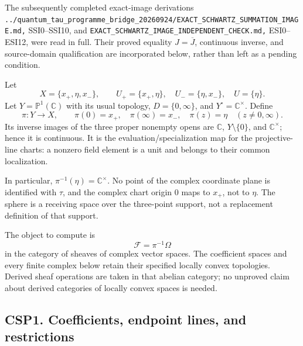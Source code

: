 The subsequently completed exact-image derivations
\nolinkurl{../quantum_tau_programme_bridge_20260924/EXACT_SCHWARTZ_SUMMATION_IMAGE.md,}
SSI0--SSI10, and \nolinkurl{EXACT_SCHWARTZ_IMAGE_INDEPENDENT_CHECK.md,}
ESI0--ESI12, were read in full. Their proved equality \(J=\overline J\),
continuous inverse, and source-domain qualification are incorporated
below, rather than left as a pending condition.

Let \[
X=\{x_+,\eta,x_-\},\qquad
U_+=\{x_+,\eta\},\quad U_-=\{\eta,x_-\},\quad U=\{\eta\}.
\tag{CSP0.1}
\] Let \(Y=\mathbb P^1(\mathbb C)\) with its usual topology,
\(D=\{0,\infty\}\), and \(Y^\circ=\mathbb C^\times\). Define \[
\pi:Y\longrightarrow X,\qquad
\pi(0)=x_+,\quad\pi(\infty)=x_-,\quad
\pi(z)=\eta\quad(z\ne0,\infty).
\tag{CSP0.2}
\] Its inverse images of the three proper nonempty opens are
\(\mathbb C\), \(Y\setminus\{0\}\), and \(\mathbb C^\times\); hence it
is continuous. It is the evaluation/specialization map for the
projective-line charts: a nonzero field element is a unit and belongs to
their common localization.

In particular, \(\pi^{-1}(\eta)=\mathbb C^\times\). No point of the
complex coordinate plane is identified with \(\tau\), and the complex
chart origin \(0\) maps to \(x_+\), not to \(\eta\). The sphere is a
receiving space over the three-point support, not a replacement
definition of that support.

The object to compute is \[
\mathscr F=\pi^{-1}\Omega
\tag{CSP0.3}
\] in the category of sheaves of complex vector spaces. The coefficient
spaces and every finite complex below retain their specified locally
convex topologies. Derived sheaf operations are taken in that abelian
category; no unproved claim about derived categories of locally convex
spaces is needed.

\subsection{CSP1. Coefficients, endpoint lines, and
restrictions}\label{csp1.-coefficients-endpoint-lines-and-restrictions}

